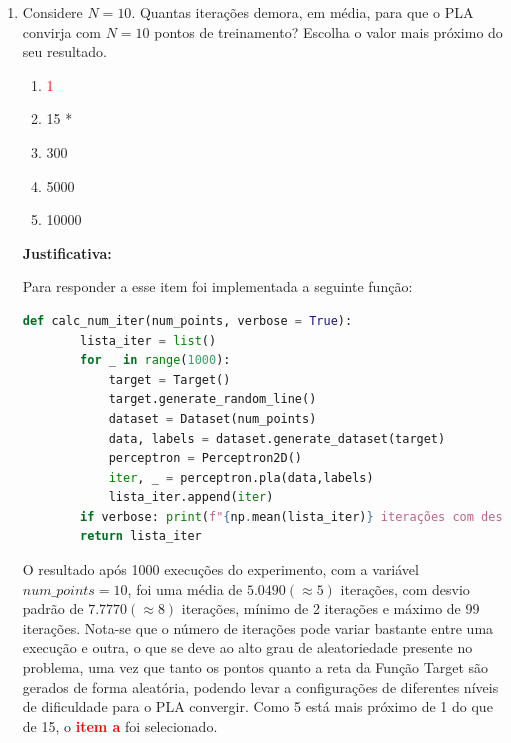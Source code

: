 \begin{enumerate}
    \item Considere $N = 10$. Quantas iterações demora, em média, para que o PLA convirja com $N = 10$
    pontos de treinamento? Escolha o valor mais próximo do seu resultado.

    \begin{enumerate}
        \item[\textcolor{red}{(a)}]\textcolor{red}{1}\addtocounter{enumii}{1}
        \item 15 *
        \item 300
        \item 5000
        \item 10000
    \end{enumerate}
     
    \par

    \textbf{Justificativa:}

    Para responder a esse item foi implementada a seguinte função:

    \begin{lstlisting}[language=Python, caption=Cálculo do número de iterações, label=cod:perceptron_num_iter]
        def calc_num_iter(num_points, verbose = True):
        lista_iter = list()
        for _ in range(1000):
            target = Target()
            target.generate_random_line()
            dataset = Dataset(num_points)
            data, labels = dataset.generate_dataset(target)
            perceptron = Perceptron2D()
            iter, _ = perceptron.pla(data,labels)
            lista_iter.append(iter)
        if verbose: print(f"{np.mean(lista_iter)} iterações com desvio padrão {np.std(lista_iter):.4f} (min:{np.min(lista_iter)}, máx:{np.max(lista_iter)})")
        return lista_iter
    \end{lstlisting}

    O resultado após 1000 execuções do experimento, com a variável $num\_points = 10$, foi uma média de $5.0490(\approx 5)$ iterações, com desvio padrão de $7.7770(\approx 8)$ iterações, mínimo de 2 iterações e máximo de 99 iterações. Nota-se que o número de iterações pode variar bastante entre uma execução e outra, o que se deve ao alto grau de aleatoriedade presente no problema, uma vez que tanto os pontos quanto a reta da Função Target são gerados de forma aleatória, podendo levar a configurações de diferentes níveis de dificuldade para o PLA convergir. 
     Como 5 está mais próximo de 1 do que de 15, o \textcolor{red}{\textbf{item a}} foi selecionado. 
    

\end{enumerate}
